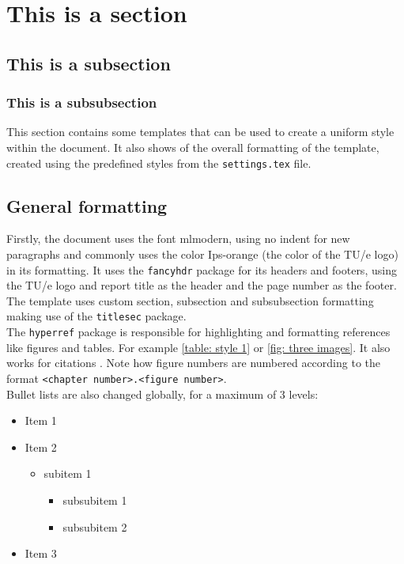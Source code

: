 
\section{This is a section}
\subsection{This is a subsection}

\subsubsection{This is a subsubsection}
This section contains some templates that can be used to create a uniform style within the document. It also shows of the overall formatting of the template, created using the predefined styles from the \texttt{settings.tex} file.

\subsection{General formatting}
Firstly, the document uses the font mlmodern, using no indent for new paragraphs and commonly uses the color \textcolor{Ips-orange}{Ips-orange} (the color of the TU/e logo) in its formatting. It uses the \texttt{fancyhdr} package for its headers and footers, using the TU/e logo and report title as the header and the page number as the footer. The template uses custom section, subsection and subsubsection formatting making use of the \texttt{titlesec} package.\\
The \texttt{hyperref} package is responsible for highlighting and formatting references like figures and tables. For example \cref{table: style 1} or \cref{fig: three images}. It also works for citations \cite{texbook}. Note how figure numbers are numbered according to the format \texttt{<chapter number>.<figure number>}.\\

Bullet lists are also changed globally, for a maximum of 3 levels:

\begin{itemize}
    \item Item 1
    \item Item 2
          \begin{itemize}
              \item subitem 1
                    \begin{itemize}
                        \item subsubitem 1
                        \item subsubitem 2
                    \end{itemize}
          \end{itemize}
    \item Item 3
\end{itemize}

